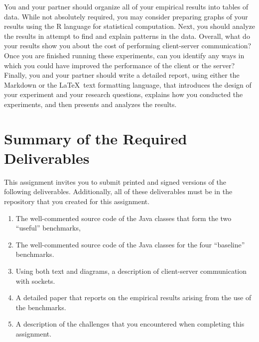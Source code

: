 You and your partner should organize all of your empirical results into tables of data. While not absolutely required,
you may consider preparing graphs of your results using the R language for statistical computation. Next, you should
analyze the results in attempt to find and explain patterns in the data. Overall, what do your results show you about
the cost of performing client-server communication? Once you are finished running these experiments, can you identify
any ways in which you could have improved the performance of the client or the server? Finally, you and your partner
should write a detailed report, using either the Markdown or the \LaTeX~text formatting language, that introduces the
design of your experiment and your research questions, explains how you conducted the experiments, and then presents and
analyzes the results.

\section*{Summary of the Required Deliverables}

This assignment invites you to submit printed and signed versions of the following deliverables. Additionally,
all of these deliverables must be in the repository that you created for this assignment.

\begin{enumerate}

    \item The well-commented source code of the Java classes that form the two ``useful'' benchmarks,

    \item The well-commented source code of the Java classes for the four ``baseline'' benchmarks.

    \item Using both text and diagrams, a description of client-server communication with sockets.

    \item A detailed paper that reports on the empirical results arising from the use of the benchmarks.

    \item A description of the challenges that you encountered when completing this assignment.

\end{enumerate}


